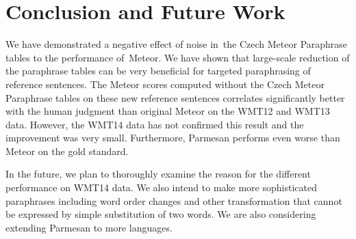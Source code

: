 \section{Conclusion and Future Work}
We have demonstrated a negative effect of noise in~the Czech Meteor Paraphrase tables to the performance 
of~Meteor. We have shown that large-scale reduction of the paraphrase tables can be very beneficial for targeted 
paraphrasing of reference sentences. The Meteor scores computed without the Czech Meteor Paraphrase tables 
on these new reference sentences correlates significantly better with the human judgment than original Meteor
on the WMT12 and WMT13 data. However, the WMT14 data has not confirmed this result and the improvement was very
small. Furthermore, Parmesan performs even worse than Meteor on the gold standard.

In the future, we plan to thoroughly examine the reason for the different performance on WMT14 data. We also 
intend to make more sophisticated paraphrases including word order changes and other transformation that cannot 
be expressed by simple substitution of two words. %
We are also considering extending Parmesan to more languages.
